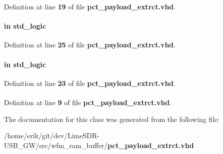 Definition at line {\bf 19} of file {\bf pct\+\_\+payload\+\_\+extrct.\+vhd}.

\paragraph[{pct\+\_\+wr}]{ {\bfseries \textcolor{keywordflow}{in}\textcolor{vhdlchar}{ }} {\bfseries \textcolor{comment}{std\+\_\+logic}\textcolor{vhdlchar}{ }} \hspace{0.3cm}{\ttfamily [Port]}}\label{classpct__payload__extrct_aa6899d989dcdf2958d6aa0dcd10ef290}


Definition at line {\bf 25} of file {\bf pct\+\_\+payload\+\_\+extrct.\+vhd}.

\paragraph[{reset\+\_\+n}]{ {\bfseries \textcolor{keywordflow}{in}\textcolor{vhdlchar}{ }} {\bfseries \textcolor{comment}{std\+\_\+logic}\textcolor{vhdlchar}{ }} \hspace{0.3cm}{\ttfamily [Port]}}\label{classpct__payload__extrct_a446ea52ed8c4a84181a47d9165ce41a5}


Definition at line {\bf 23} of file {\bf pct\+\_\+payload\+\_\+extrct.\+vhd}.

\paragraph[{std\+\_\+logic\+\_\+1164}]{\hspace{0.3cm}{\ttfamily [Package]}}\label{classpct__payload__extrct_acd03516902501cd1c7296a98e22c6fcb}


Definition at line {\bf 9} of file {\bf pct\+\_\+payload\+\_\+extrct.\+vhd}.



The documentation for this class was generated from the following file\+:\begin{DoxyCompactItemize}
\item 
/home/erik/git/dev/\+Lime\+S\+D\+R-\/\+U\+S\+B\+\_\+\+G\+W/src/wfm\+\_\+ram\+\_\+buffer/{\bf pct\+\_\+payload\+\_\+extrct.\+vhd}\end{DoxyCompactItemize}
